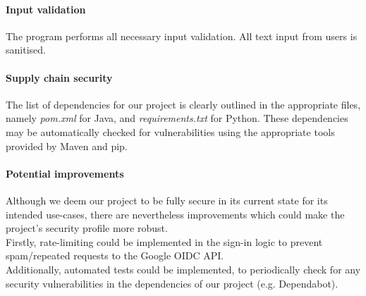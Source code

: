 \documentclass[11pt]{article}
\begin{document}
\newpage
\paragraph{Input validation}
The program performs all necessary input validation. All text input from users is sanitised.

\paragraph{Supply chain security}
The list of dependencies for our project is clearly outlined in the appropriate files, namely \textit{pom.xml} for Java, and \textit{requirements.txt} for Python. These dependencies may be automatically checked for vulnerabilities using the appropriate tools provided by Maven and pip.

\paragraph{Potential improvements}
Although we deem our project to be fully secure in its current state for its intended use-cases, there are nevertheless improvements which could make the project's security profile more robust. \\
Firstly, rate-limiting could be implemented in the sign-in logic to prevent spam/repeated requests to the Google OIDC API. \\
Additionally, automated tests could be implemented, to periodically check for any security vulnerabilities in the dependencies of our project (e.g. Dependabot).
\end{document}
